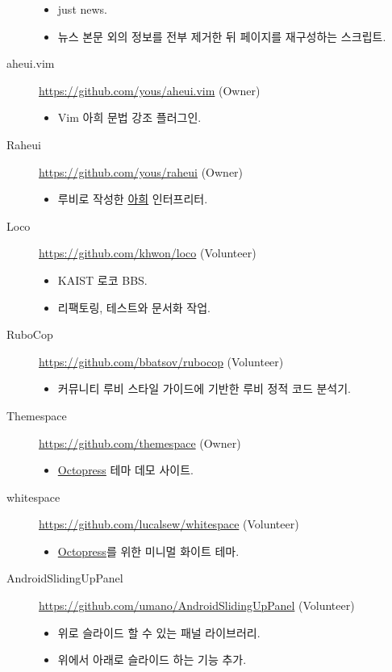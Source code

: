 \documentclass[a4paper,10pt]{article}
\begin{document}
\begin{description}
    \begin{itemize}
      \item just news.
      \item 뉴스 본문 외의 정보를 전부 제거한 뒤 페이지를 재구성하는 스크립트.
    \end{itemize}
  \item[aheui.vim] \url{https://github.com/yous/aheui.vim} (Owner)
    \begin{itemize}
      \item Vim 아희 문법 강조 플러그인.
    \end{itemize}
  \item[Raheui] \url{https://github.com/yous/raheui} (Owner)
    \begin{itemize}
      \item 루비로 작성한 \href{http://aheui.github.io}{아희} 인터프리터.
    \end{itemize}
  \item[Loco] \url{https://github.com/khwon/loco} (Volunteer)
    \begin{itemize}
      \item KAIST 로코 BBS.
      \item 리팩토링, 테스트와 문서화 작업.
    \end{itemize}
  \item[RuboCop] \url{https://github.com/bbatsov/rubocop} (Volunteer)
    \begin{itemize}
      \item 커뮤니티 루비 스타일 가이드에 기반한 루비 정적 코드 분석기.
    \end{itemize}
  \item[Themespace] \url{https://github.com/themespace} (Owner)
    \begin{itemize}
      \item \href{http://octopress.org}{Octopress} 테마 데모 사이트.
    \end{itemize}
  \item[whitespace] \url{https://github.com/lucalsew/whitespace} (Volunteer)
    \begin{itemize}
      \item \href{http://octopress.org}{Octopress}를 위한 미니멀 화이트 테마.
    \end{itemize}
  \item[AndroidSlidingUpPanel] \url{https://github.com/umano/AndroidSlidingUpPanel} (Volunteer)
    \begin{itemize}
      \item 위로 슬라이드 할 수 있는 패널 라이브러리.
      \item 위에서 아래로 슬라이드 하는 기능 추가.
    \end{itemize}
\end{description}


\end{document}
